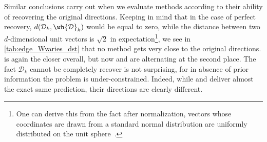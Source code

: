 Similar conclusions carry out when we evaluate methods according to their ability of recovering the
original directions. Keeping in mind that in the case of perfect recovery, $d(\mathcal{D}_k,
\mathcal{\wh{D}}_k)$ would be equal to zero, while the distance between two $d$-dimensional unit
vectors is $\sqrt{2}$ in expectation\footnote{One can derive this from the fact after normalization,
vectors whose coordinates are drawn from a standard normal distribution are uniformly distributed on
the unit sphere~\autocite{gaussianSphere59}.}, we see in \autoref{tab:edge_Wvaries_dst} that no
method gets very close to the original directions. \combined{} is again the closer overall, but now
\kmeans{} and \lloyd{} are alternating at the second place. The fact $\mathcal{D}_k$ cannot be
completely recover is not surprising, for in absence of prior information the problem is
under-constrained. Indeed, while \combined{} and \pqt{} deliver almost the exact same prediction,
their directions are clearly different.

